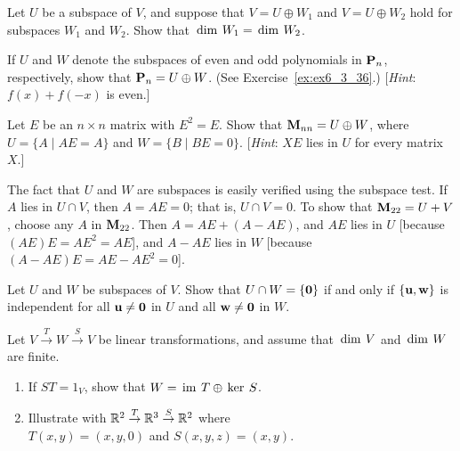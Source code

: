 \begin{multicols}{2}
\begin{ex}
Let $U$ be a subspace of $V$, and suppose that $V = U \oplus W_{1}$ and $V = U \oplus W_{2}$ hold for subspaces $W_{1}$ and $W_{2}$. Show that $\thinspace\operatorname{dim \medspace}W_{1} = \thinspace\operatorname{dim \medspace}W_{2}$.
\end{ex}

\begin{ex}
If $U$ and $W$ denote the subspaces of even and odd polynomials in $\textbf{P}_{n}$, respectively, show that $\textbf{P}_{n} = U \oplus W$. (See Exercise~\ref{ex:ex6_3_36}.) [\textit{Hint}: $f(x) + f(-x)$ is even.]
\end{ex}

\begin{ex}
Let $E$ be an $n \times n$ matrix with $E^{2} = E$. Show that $\textbf{M}_{nn} = U \oplus W$, where $U = \{A \mid AE = A\}$ and $W = \{B \mid BE = 0\}$. [\textit{Hint}: $XE$ lies in $U$ for every matrix $X$.]

\begin{sol}
The fact that $U$ and $W$ are subspaces is easily verified using the subspace test. If $A$ lies in $U \cap V$, then $A = AE = 0$; that is, $U \cap V = 0$. To show that $\textbf{M}_{22} = U + V$, choose any $A$ in $\textbf{M}_{22}$. Then $A = AE + (A - AE)$, and $AE$ lies in $U$ [because $(AE)E = AE^{2} = AE$], and $A - AE$ lies in $W$ [because $(A - AE)E = AE - AE^{2} = 0$].
\end{sol}
\end{ex}

\begin{ex}
Let $U$ and $W$ be subspaces of $V$. Show that $U \cap W = \{\textbf{0}\}$ if and only if $\{\textbf{u}, \textbf{w}\}$ is independent for all $\textbf{u} \neq \textbf{0}$ in $U$ and all $\textbf{w} \neq \textbf{0}$ in $W$.
\end{ex}

\begin{ex}
Let $V \stackrel{T}{\to} W \stackrel{S}{\to} V$ be linear transformations, and assume that $\thinspace\operatorname{dim \medspace}V$ and $\thinspace\operatorname{dim \medspace}W$ are finite.


\begin{enumerate}[label={\alph*.}]
\item If $ST = 1_{V}$, show that $W = \thinspace\operatorname{im \medspace}T \oplus \thinspace\operatorname{ker \medspace}S$. 

\item Illustrate with $\mathbb{R}^2 \stackrel{T}{\to} \mathbb{R}^3 \stackrel{S}{\to} \mathbb{R}^2$ where \\ $T(x, y) = (x, y, 0)$ and $S(x, y, z) = (x, y)$.


\end{enumerate}
\end{ex}
\end{multicols}
